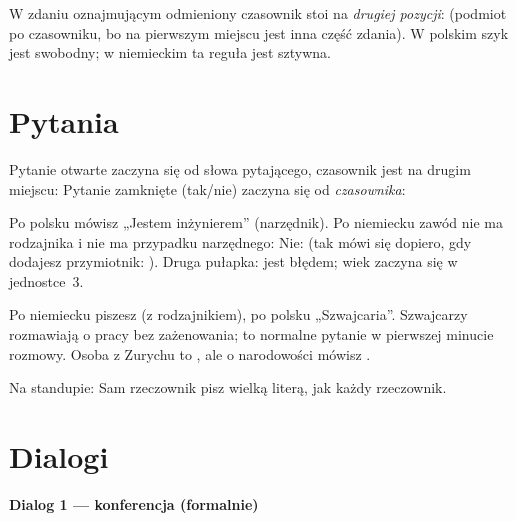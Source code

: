 \begin{zasada}
W zdaniu oznajmującym odmieniony czasownik stoi na \emph{drugiej pozycji}: 
 (podmiot po czasowniku, bo na pierwszym miejscu jest inna część zdania).
W polskim szyk jest swobodny; w niemieckim ta reguła jest sztywna.
\end{zasada}

\section{Pytania}
Pytanie otwarte zaczyna się od słowa pytającego, czasownik jest na drugim miejscu:
   
Pytanie zamknięte (tak/nie) zaczyna się od \emph{czasownika}:  

\begin{falle}
Po polsku mówisz „Jestem inżynierem” (narzędnik). Po niemiecku zawód nie ma rodzajnika i nie ma
przypadku narzędnego:  Nie:  (tak mówi się dopiero,
gdy dodajesz przymiotnik: ). Druga pułapka:  jest błędem;
wiek zaczyna się w jednostce~3.
\end{falle}

\begin{szwajcaria}
Po niemiecku piszesz  (z rodzajnikiem), po polsku „Szwajcaria”. Szwajcarzy
rozmawiają o pracy bez zażenowania;  to normalne pytanie w pierwszej minucie
rozmowy. Osoba z Zurychu to , ale o narodowości mówisz .
\end{szwajcaria}

\begin{praca}
Na standupie:   Sam rzeczownik
 pisz wielką literą, jak każdy rzeczownik.
\end{praca}

\section{Dialogi}
\textbf{Dialog 1 --- konferencja (formalnie)}
\begin{dialog}
\end{dialog}

